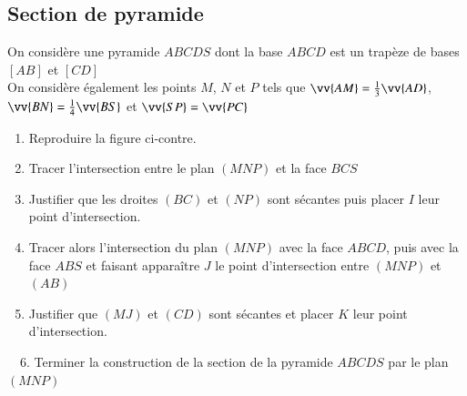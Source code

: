 \documentclass[oneside,12pt]{article}          %
\begin{document}
\subsection{Section de pyramide}
\begin{minipage}{0.65\linewidth}
On considère une pyramide $ABCDS$ dont la base $ABCD$ est un trapèze de bases $[AB]$ et $[CD]$ \\
On considère également les points $M$, $N$ et $P$ tels que $\vv{AM}=\frac{1}{3}\vv{AD}$, $\vv{BN}=\frac{1}{4}\vv{BS}$ et $\vv{SP}=\vv{PC}$
\begin{enumerate}
	\item Reproduire la figure ci-contre.
	\item Tracer l'intersection entre le plan $(MNP)$ et la face $BCS$
	\item Justifier que les droites $(BC)$ et $(NP)$ sont sécantes puis placer $I$ leur point d'intersection.
	\item Tracer alors l'intersection du plan $(MNP)$ avec la face $ABCD$, puis avec la face $ABS$ et faisant apparaître $J$ le point d'intersection entre $(MNP)$ et $(AB)$
	\item Justifier que $(MJ)$ et $(CD)$ sont sécantes et placer $K$ leur point d'intersection.
\end{enumerate}
\end{minipage}\hfill
\begin{minipage}{0.3\linewidth}
\end{minipage}

\quad ~\, 6. Terminer la construction de la section de la pyramide $ABCDS$ par le plan $(MNP)$
\end{document}
